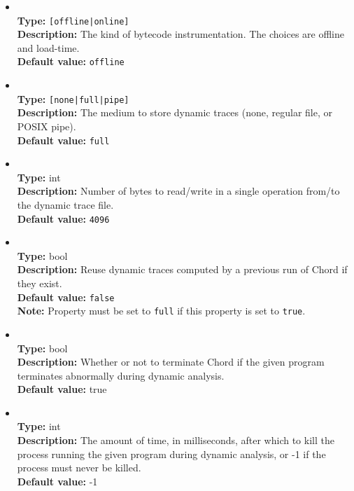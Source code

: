 \begin{itemize}
\item
{} \\
{\bf Type:} {\tt [offline|online]} \\
{\bf Description:} The kind of bytecode instrumentation.  The choices are offline and load-time. \\
{\bf Default value:} {\tt offline} \\

\item
{} \\
{\bf Type:} {\tt [none|full|pipe]} \\
{\bf Description:} The medium to store dynamic traces (none, regular file, or POSIX pipe). \\
{\bf Default value:} {\tt full} 

\item
{} \\
{\bf Type:} int \\
{\bf Description:} Number of bytes to read/write in a single operation from/to the dynamic trace file. \\
{\bf Default value:} {\tt 4096} 

\item
{} \\
{\bf Type:} bool \\
{\bf Description:} Reuse dynamic traces computed by a previous run of Chord if they exist. \\
{\bf Default value:} {\tt false} \\
{\bf Note:} Property  must be set to {\tt full} if this property is set to {\tt true}.

\item
{} \\
{\bf Type:} bool \\
{\bf Description:} Whether or not to terminate Chord if the given program terminates abnormally during dynamic analysis. \\
{\bf Default value:} true

\item
{} \\
{\bf Type:} int \\
{\bf Description:} The amount of time, in milliseconds, after which to kill the process running the given program during dynamic analysis, or -1 if the process must never be killed. \\
{\bf Default value:} -1


\end{itemize}
